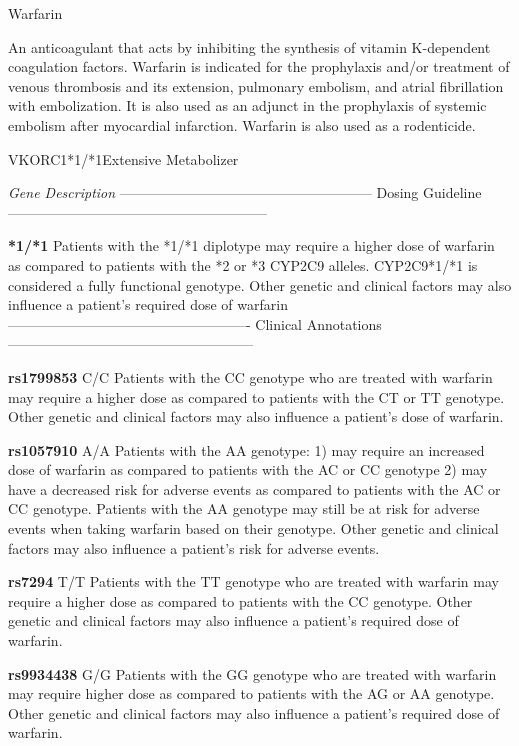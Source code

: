 \documentclass{resume} %
\begin{document}
\begin{rSection}{Warfarin}
\item An anticoagulant that acts by inhibiting the synthesis of vitamin K-dependent coagulation factors. Warfarin is indicated for the prophylaxis and/or treatment of venous thrombosis and its extension, pulmonary embolism, and atrial fibrillation with embolization. It is also used as an adjunct in the prophylaxis of systemic embolism after myocardial infarction. Warfarin is also used as a rodenticide.

\begin{rSubsection}{VKORC1}{*1/*1}{Extensive Metabolizer}{}
\item \textit{Gene Description}
\newline\newline ------------------------------------------------------ Dosing Guideline --------------------------------------------------------
\item \textbf{*1/*1} \newline Patients with the *1/*1 diplotype may require a higher dose of warfarin as compared to patients with the *2 or *3 CYP2C9 alleles. CYP2C9*1/*1 is considered a fully functional genotype. Other genetic and clinical factors may also influence a patient's required dose of warfarin 
\newline\newline ---------------------------------------------------- Clinical Annotations -----------------------------------------------------
\item \textbf{rs1799853} C/C \newline Patients with the CC genotype who are treated with warfarin may require a higher dose as compared to patients with the CT or TT genotype. Other genetic and clinical factors may also influence a patient's dose of warfarin.
\item \textbf{rs1057910} A/A \newline Patients with the AA genotype: 1) may require an increased dose of warfarin as compared to patients with the AC or CC genotype 2) may have a decreased risk for adverse events as compared to patients with the AC or CC genotype. Patients with the AA genotype may still be at risk for adverse events when taking warfarin based on their genotype. Other genetic and clinical factors may also influence a patient's risk for adverse events.
\item \textbf{rs7294} T/T \newline Patients with the TT genotype who are treated with warfarin may require a higher dose as compared to patients with the CC genotype. Other genetic and clinical factors may also influence a patient's required dose of warfarin.
\item \textbf{rs9934438} G/G \newline Patients with the GG genotype who are treated with warfarin may require higher dose as compared to patients with the AG or AA genotype. Other genetic and clinical factors may also influence a patient's required dose of warfarin.
\end{rSubsection}

\end{rSection}
\end{document}
